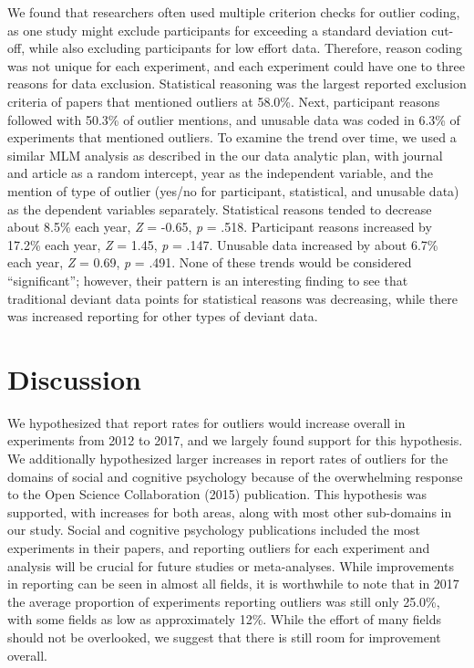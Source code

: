 \documentclass[english,,man]{apa6}
\begin{document}
We found that researchers often used multiple criterion checks for outlier coding, as one study might exclude participants for exceeding a standard deviation cut-off, while also excluding participants for low effort data. Therefore, reason coding was not unique for each experiment, and each experiment could have one to three reasons for data exclusion. Statistical reasoning was the largest reported exclusion criteria of papers that mentioned outliers at 58.0\%. Next, participant reasons followed with 50.3\% of outlier mentions, and unusable data was coded in 6.3\% of experiments that mentioned outliers. To examine the trend over time, we used a similar MLM analysis as described in the our data analytic plan, with journal and article as a random intercept, year as the independent variable, and the mention of type of outlier (yes/no for participant, statistical, and unusable data) as the dependent variables separately. Statistical reasons tended to decrease about 8.5\% each year, \emph{Z} = -0.65, \emph{p} = .518. Participant reasons increased by 17.2\% each year, \emph{Z} = 1.45, \emph{p} = .147. Unusable data increased by about 6.7\% each year, \emph{Z} = 0.69, \emph{p} = .491. None of these trends would be considered \enquote{significant}; however, their pattern is an interesting finding to see that traditional deviant data points for statistical reasons was decreasing, while there was increased reporting for other types of deviant data.

\hypertarget{discussion}{%
\section{Discussion}\label{discussion}}

We hypothesized that report rates for outliers would increase overall in experiments from 2012 to 2017, and we largely found support for this hypothesis. We additionally hypothesized larger increases in report rates of outliers for the domains of social and cognitive psychology because of the overwhelming response to the Open Science Collaboration (2015) publication. This hypothesis was supported, with increases for both areas, along with most other sub-domains in our study. Social and cognitive psychology publications included the most experiments in their papers, and reporting outliers for each experiment and analysis will be crucial for future studies or meta-analyses. While improvements in reporting can be seen in almost all fields, it is worthwhile to note that in 2017 the average proportion of experiments reporting outliers was still only 25.0\%, with some fields as low as approximately 12\%. While the effort of many fields should not be overlooked, we suggest that there is still room for improvement overall.
\end{document}
